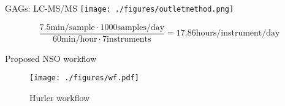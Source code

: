 \documentclass[presentation, smaller]{beamer}
\begin{document}
\begin{frame}[label={sec:orgheadline18}]{GAGs: LC-MS/MS}
\texttt{[image: ./figures/outletmethod.png]}


\[
\frac{7.5 \text{min/sample} \cdot 1000 \text{samples/day}}{60 \text{min/hour} \cdot 7 \text{instruments}}
= 17.86 \text{hours/instrument/day}
\]
\end{frame}

\begin{frame}[label={sec:orgheadline19}]{Proposed NSO workflow}
\begin{figure}[htb]
\centering
\texttt{[image: ./figures/wf.pdf]}
\caption{\label{fig:wf}
Hurler workflow}
\end{figure}
\end{frame}
\end{document}
